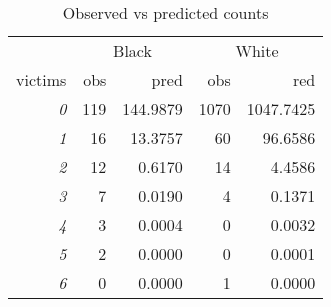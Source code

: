 \begin{table}[H]

\caption{\label{tab:obs_vs_pred}Observed vs predicted counts}
\centering
\begin{tabular}[t]{>{}r|r|r|r|r}
\hline
\multicolumn{1}{c|}{ } & \multicolumn{2}{c|}{Black} & \multicolumn{2}{c}{White} \\
\cline{2-3} \cline{4-5}
victims & obs & pred & obs & red\\
\hline
\em{0} & 119 & 144.9879 & 1070 & 1047.7425\\
\hline
\em{1} & 16 & 13.3757 & 60 & 96.6586\\
\hline
\em{2} & 12 & 0.6170 & 14 & 4.4586\\
\hline
\em{3} & 7 & 0.0190 & 4 & 0.1371\\
\hline
\em{4} & 3 & 0.0004 & 0 & 0.0032\\
\hline
\em{5} & 2 & 0.0000 & 0 & 0.0001\\
\hline
\em{6} & 0 & 0.0000 & 1 & 0.0000\\
\hline
\end{tabular}
\end{table}
